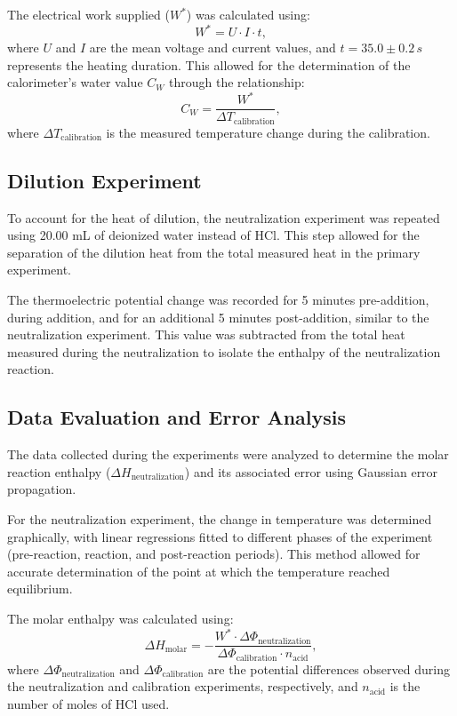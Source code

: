 \documentclass[a4paper,12pt]{article}
\begin{document}
The electrical work supplied (\(W^*\)) was calculated using:
\[
W^* = U \cdot I \cdot t,
\]
where \(U\) and \(I\) are the mean voltage and current values, and \(t = 35.0 \pm 0.2 \, s\) represents the heating duration. This allowed for the determination of the calorimeter's water value \(C_W\) through the relationship:
\[
C_W = \frac{W^*}{\Delta T_{\text{calibration}}},
\]
where \(\Delta T_{\text{calibration}}\) is the measured temperature change during the calibration.

\subsection{Dilution Experiment}
To account for the heat of dilution, the neutralization experiment was repeated using 20.00 mL of deionized water instead of HCl. This step allowed for the separation of the dilution heat from the total measured heat in the primary experiment.

The thermoelectric potential change was recorded for 5 minutes pre-addition, during addition, and for an additional 5 minutes post-addition, similar to the neutralization experiment. This value was subtracted from the total heat measured during the neutralization to isolate the enthalpy of the neutralization reaction.

\subsection{Data Evaluation and Error Analysis}
The data collected during the experiments were analyzed to determine the molar reaction enthalpy (\(\Delta H_{\text{neutralization}}\)) and its associated error using Gaussian error propagation.

For the neutralization experiment, the change in temperature was determined graphically, with linear regressions fitted to different phases of the experiment (pre-reaction, reaction, and post-reaction periods). This method allowed for accurate determination of the point at which the temperature reached equilibrium.

The molar enthalpy was calculated using:
\[
\Delta H_{\text{molar}} = -\frac{W^* \cdot \Delta \Phi_{\text{neutralization}}}{\Delta \Phi_{\text{calibration}} \cdot n_{\text{acid}}},
\]
where \(\Delta \Phi_{\text{neutralization}}\) and \(\Delta \Phi_{\text{calibration}}\) are the potential differences observed during the neutralization and calibration experiments, respectively, and \(n_{\text{acid}}\) is the number of moles of HCl used.
\end{document}

